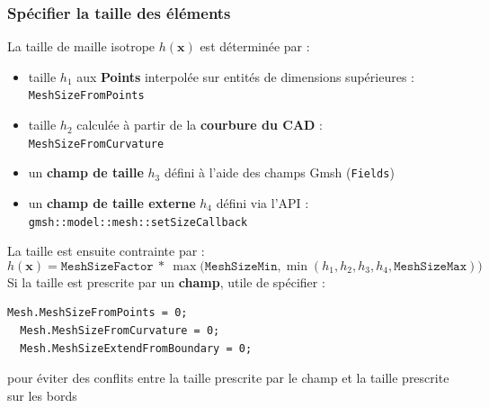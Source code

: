\documentclass[aspectratio=169]{beamer}
\begin{document}
\begin{frame}[fragile]
\frametitle{Spécifier la taille des éléments}
\footnotesize
La taille de maille isotrope $h(\mathbf{x})$ est déterminée par :
  \begin{itemize}
    \item taille $h_1$ aux \textbf{Points} interpolée sur entités de dimensions supérieures : \texttt{MeshSizeFromPoints}
    \item taille $h_2$ calculée à partir de la \textbf{courbure du CAD} : \texttt{MeshSizeFromCurvature}
    \item un \textbf{champ de taille} $h_3$ défini à l'aide des champs Gmsh (\texttt{Fields})
    \item un \textbf{champ de taille externe} $h_4$ défini via l'API : \texttt{gmsh::model::mesh::setSizeCallback}
  \end{itemize}
  La taille est ensuite contrainte par :
  \begin{equation*}
    h(\mathbf{x}) = \texttt{MeshSizeFactor}~*~\max\biggr( \texttt{MeshSizeMin}, \min\left( h_1, h_2, h_3, h_4, \texttt{MeshSizeMax}\right) \biggr)
  \end{equation*}
  Si la taille est prescrite par un \textbf{champ}, utile de spécifier :
  \begin{lstlisting}[belowskip=0.5mm]
  Mesh.MeshSizeFromPoints = 0;
  Mesh.MeshSizeFromCurvature = 0;
  Mesh.MeshSizeExtendFromBoundary = 0;
  \end{lstlisting}
  pour éviter des conflits entre la taille prescrite par le champ et la taille prescrite sur les bords
\end{frame}
\end{document}
